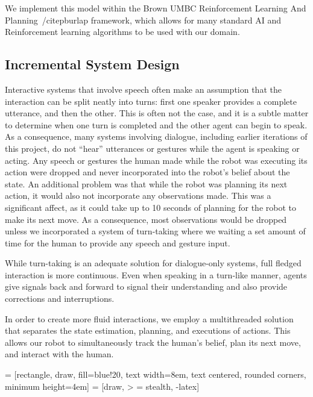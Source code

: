 \documentclass{article}
\begin{document}
\begin{multicols}{2}
We implement this model within the Brown UMBC Reinforcement Learning And Planning~/citep{burlap} framework, which allows for many standard AI and Reinforcement learning algorithms to be used with our domain. 


\subsection{Incremental System Design}

Interactive systems that involve speech often make an assumption that the interaction can be split neatly into turns: first one speaker provides a complete utterance, and then the other. This is often not the case, and it is a subtle matter to determine when one turn is completed and the other agent can begin to speak. As a consequence, many systems involving dialogue, including earlier iterations of this project, do not ``hear'' utterances or gestures while the agent is speaking or acting. Any speech or gestures the human made while the robot was executing its action were dropped and never incorporated into the robot's belief about the state. An additional problem was that while the robot was planning its next action, it would also not incorporate any observations made. This was a significant affect, as it could take up to 10 seconds of planning for the robot to make its next move. As a consequence, most observations would be dropped unless we incorporated a system of turn-taking where we waiting a set amount of time for the human to provide any speech and gesture input. 

While turn-taking is an adequate solution for dialogue-only systems, full fledged interaction is more continuous. Even when speaking in a turn-like manner, agents give signals back and forward to signal their understanding and also provide corrections and interruptions.

In order to create more fluid interactions, we employ a multithreaded solution that separates the state estimation, planning, and executions of actions. This allows our robot to simultaneously track the human's belief, plan its next move, and interact with the human. 


 = [rectangle, draw, fill=blue!20, text width=8em, text centered, rounded corners, minimum height=4em]
 = [draw, > = stealth, -latex]


\end{multicols}
\end{document}
